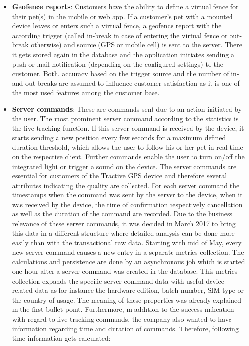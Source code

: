 \begin{itemize}
	\item \textbf{Geofence reports}: Customers have the ability to define a virtual fence for their pet(s) in the mobile or web app. If a customer's pet with a mounted device leaves or enters such a virtual fence, a geofence report with the according trigger (called in-break in case of entering the virtual fence or out-break otherwise) and source (GPS or mobile cell) is sent to the server. There it gets stored again in the database and the application initiates sending a push or mail notification (depending on the configured settings) to the customer. Both, accuracy based on the trigger source and the number of in- and out-breaks are assumed to influence customer satisfaction as it is one of the most used features among the customer base.  
	\item \textbf{Server commands}: These are commands sent due to an action initiated by the user. The most prominent server command according to the statistics is the live tracking function. If this server command is received by the device, it starts sending a new position every few seconds for a maximum defined duration threshold, which allows the user to follow his or her pet in real time on the respective client. Further commands enable the user to turn on/off the integrated light or trigger a sound on the device. The server commands are essential for customers of the Tractive GPS device and therefore several attributes indicating the quality are collected. For each server command the timestamps when the command was sent by the server to the device, when it was received by the device, the time of confirmation respectively cancellation as well as the duration of the command are recorded. 
	Due to the business relevance of these server commands, it was decided in March 2017 to bring this data in a different structure where detailed analysis can be done more easily than with the transactional raw data. Starting with mid of May, every new server command causes a new entry in a separate metrics collection. The calculations and persistence are done by an asynchronous job which is started one hour after a server command was created in the database. This metrics collection expands the specific server command data with useful device related data as for instance the hardware edition, batch number, SIM type or the country of usage. The meaning of these properties was already explained in the first bullet point. Furthermore, in addition to the success indication with regard to live tracking commands, the company also wanted to have information regarding time and duration of commands. Therefore, following time information gets calculated:
	

\end{itemize}
